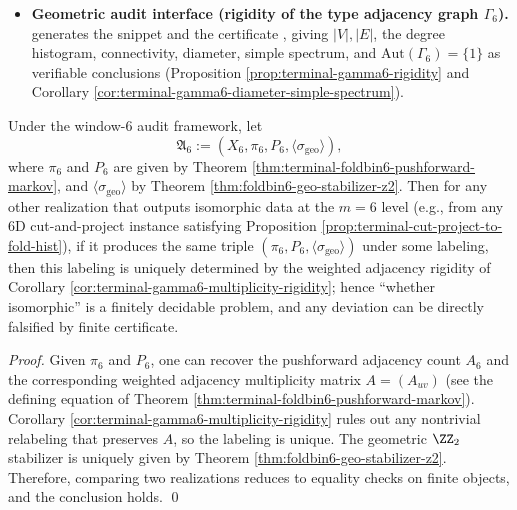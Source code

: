 \begin{itemize}
  \item \textbf{Geometric audit interface (rigidity of the type adjacency graph \texorpdfstring{$\Gamma_6$}{Gamma6}).}
  \texttt{} generates the snippet
  \texttt{}
  and the certificate \texttt{},
  giving \(|V|,|E|\), the degree histogram, connectivity, diameter, simple spectrum, and \(\mathrm{Aut}(\Gamma_6)=\{1\}\) as verifiable conclusions (Proposition \ref{prop:terminal-gamma6-rigidity} and Corollary \ref{cor:terminal-gamma6-diameter-simple-spectrum}).
\end{itemize}

\begin{corollary}\label{cor:terminal-window6-finite-completeness-template}
Under the window-\(6\) audit framework, let
\[
\mathfrak{A}_6:=(X_6,\pi_6,P_6,\langle\sigma_{\mathrm{geo}}\rangle),
\]
where \(\pi_6\) and \(P_6\) are given by Theorem \ref{thm:terminal-foldbin6-pushforward-markov}, and \(\langle\sigma_{\mathrm{geo}}\rangle\) by Theorem \ref{thm:foldbin6-geo-stabilizer-z2}.
Then for any other realization that outputs isomorphic data at the \(m=6\) level (e.g., from any 6D cut-and-project instance satisfying Proposition \ref{prop:terminal-cut-project-to-fold-hist}),
if it produces the same triple \((\pi_6,P_6,\langle\sigma_{\mathrm{geo}}\rangle)\) under some labeling, then this labeling is uniquely determined by the weighted adjacency rigidity of Corollary \ref{cor:terminal-gamma6-multiplicity-rigidity};
hence ``whether isomorphic'' is a finitely decidable problem, and any deviation can be directly falsified by finite certificate.
\end{corollary}
\begin{proof}
Given \(\pi_6\) and \(P_6\), one can recover the pushforward adjacency count \(A_6\) and the corresponding weighted adjacency multiplicity matrix \(A=(A_{uv})\) (see the defining equation of Theorem \ref{thm:terminal-foldbin6-pushforward-markov}).
Corollary \ref{cor:terminal-gamma6-multiplicity-rigidity} rules out any nontrivial relabeling that preserves \(A\), so the labeling is unique.
The geometric \(\ZZ_2\) stabilizer is uniquely given by Theorem \ref{thm:foldbin6-geo-stabilizer-z2}.
Therefore, comparing two realizations reduces to equality checks on finite objects, and the conclusion holds. \qed
\end{proof}

